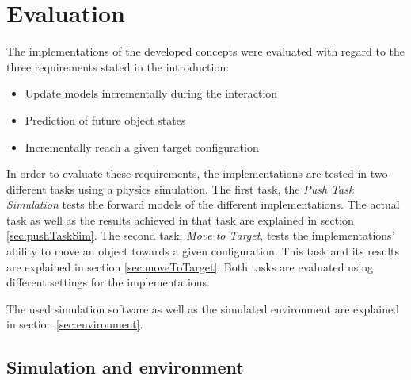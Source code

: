 \chapter{Evaluation\label{chap:evaluation}}



The implementations of the developed concepts were evaluated with regard to the three requirements stated in the introduction: 
\begin{itemize}
\item Update models incrementally during the interaction
\item Prediction of future object states
\item Incrementally reach a given target configuration
\end{itemize}

In order to evaluate these requirements, the implementations are tested in two different tasks using a physics simulation. The first task, the \textit{Push Task Simulation} tests the forward models of the different implementations. The actual task as well as the results achieved in that task are explained in section \ref{sec:pushTaskSim}.
The second task, \textit{Move to Target}, tests the implementations' ability to move an object towards a given configuration. This task and its results are explained in section \ref{sec:moveToTarget}.
Both tasks are evaluated using different settings for the implementations.

The used simulation software as well as the simulated environment are explained in section \ref{sec:environment}.


\section{Simulation and environment \label{sec:environment}}

